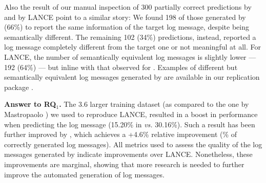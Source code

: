 Also the result of our manual inspection of 300 partially correct predictions by \approach and by LANCE point to a similar story: We found 198 of those generated by \approach (66\%) to report the same information of the target log message, despite being semantically different. The remaining 102 (34\%) predictions, instead, reported a log message completely different from the target one or not meaningful at all. For LANCE, the number of semantically equivalent log messages is slightly lower --- 192 (64\%) --- but inline with that observed for \approach. Examples of different but semantically equivalent log messages generated by \approach are available in our replication package \cite{replication}.


\vspace{0.2cm}
\begin{resultbox}
\textbf{Answer to RQ$_1$.} The 3.6 larger training dataset (as compared to the one by Mastropaolo \etal \cite{mastropaolo2022using}) we used to reproduce LANCE, resulted in a boost in performance when predicting the log message (15.20\% in \cite{mastropaolo2022using} \emph{vs.} 30.16\%). Such a result has been further improved by \approach, which achieves a +4.6\% relative improvement (\% of correctly generated log messages). All metrics used to assess the quality of the log messages generated by \approach indicate improvements over LANCE. Nonetheless, these improvements are marginal, showing that more research is needed to further improve the automated generation of log messages.
\end{resultbox}












